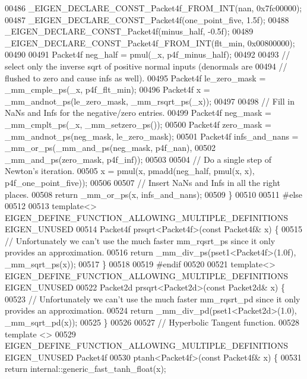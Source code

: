 \begin{DoxyCode}
00486   \_EIGEN\_DECLARE\_CONST\_Packet4f\_FROM\_INT(nan, 0x7fc00000);
00487   \_EIGEN\_DECLARE\_CONST\_Packet4f(one\_point\_five, 1.5f);
00488   \_EIGEN\_DECLARE\_CONST\_Packet4f(minus\_half, -0.5f);
00489   \_EIGEN\_DECLARE\_CONST\_Packet4f\_FROM\_INT(flt\_min, 0x00800000);
00490 
00491   Packet4f neg\_half = pmul(\_x, p4f\_minus\_half);
00492 
00493   \textcolor{comment}{// select only the inverse sqrt of positive normal inputs (denormals are}
00494   \textcolor{comment}{// flushed to zero and cause infs as well).}
00495   Packet4f le\_zero\_mask = \_mm\_cmple\_ps(\_x, p4f\_flt\_min);
00496   Packet4f x = \_mm\_andnot\_ps(le\_zero\_mask, \_mm\_rsqrt\_ps(\_x));
00497 
00498   \textcolor{comment}{// Fill in NaNs and Infs for the negative/zero entries.}
00499   Packet4f neg\_mask = \_mm\_cmplt\_ps(\_x, \_mm\_setzero\_ps());
00500   Packet4f zero\_mask = \_mm\_andnot\_ps(neg\_mask, le\_zero\_mask);
00501   Packet4f infs\_and\_nans = \_mm\_or\_ps(\_mm\_and\_ps(neg\_mask, p4f\_nan),
00502                                      \_mm\_and\_ps(zero\_mask, p4f\_inf));
00503 
00504   \textcolor{comment}{// Do a single step of Newton's iteration.}
00505   x = pmul(x, pmadd(neg\_half, pmul(x, x), p4f\_one\_point\_five));
00506 
00507   \textcolor{comment}{// Insert NaNs and Infs in all the right places.}
00508   \textcolor{keywordflow}{return} \_mm\_or\_ps(x, infs\_and\_nans);
00509 \}
00510 
00511 \textcolor{preprocessor}{#else}
00512 
00513 \textcolor{keyword}{template}<> EIGEN\_DEFINE\_FUNCTION\_ALLOWING\_MULTIPLE\_DEFINITIONS EIGEN\_UNUSED
00514 Packet4f prsqrt<Packet4f>(\textcolor{keyword}{const} Packet4f& x) \{
00515   \textcolor{comment}{// Unfortunately we can't use the much faster mm\_rqsrt\_ps since it only provides an approximation.}
00516   \textcolor{keywordflow}{return} \_mm\_div\_ps(pset1<Packet4f>(1.0f), \_mm\_sqrt\_ps(x));
00517 \}
00518 
00519 \textcolor{preprocessor}{#endif}
00520 
00521 \textcolor{keyword}{template}<> EIGEN\_DEFINE\_FUNCTION\_ALLOWING\_MULTIPLE\_DEFINITIONS EIGEN\_UNUSED
00522 Packet2d prsqrt<Packet2d>(\textcolor{keyword}{const} Packet2d& x) \{
00523   \textcolor{comment}{// Unfortunately we can't use the much faster mm\_rqsrt\_pd since it only provides an approximation.}
00524   \textcolor{keywordflow}{return} \_mm\_div\_pd(pset1<Packet2d>(1.0), \_mm\_sqrt\_pd(x));
00525 \}
00526 
00527 \textcolor{comment}{// Hyperbolic Tangent function.}
00528 \textcolor{keyword}{template} <>
00529 EIGEN\_DEFINE\_FUNCTION\_ALLOWING\_MULTIPLE\_DEFINITIONS EIGEN\_UNUSED Packet4f
00530 ptanh<Packet4f>(\textcolor{keyword}{const} Packet4f& x) \{
00531   \textcolor{keywordflow}{return} internal::generic\_fast\_tanh\_float(x);

\end{DoxyCode}
